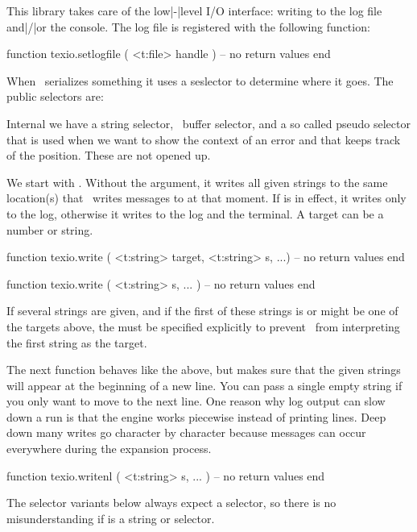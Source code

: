 \stopsection

\startsection[title={Input and output}]

This library takes care of the low|-|level I/O interface: writing to the log file
and|/|or the console. The log file is registered with the following function:

\starttyping[option=LUA]
function texio.setlogfile ( <t:file> handle )
    -- no return values
end
\stoptyping

When \TEX\ serializes something it uses a seslector to determine where it goes.
The public selectors are:


Internal we have a string selector, \LUA\ buffer selector, and a so called pseudo
selector that is used when we want to show the context of an error and that keeps
track of the position. These are not opened up.

We start with . Without the  argument, it writes
all given strings to the same location(s) that \TEX\ writes messages to at that
moment. If \type {\batchmode} is in effect, it writes only to the log, otherwise
it writes to the log and the terminal. A target can be a number or string.

\starttyping[option=LUA]
function texio.write ( <t:string> target, <t:string> s, ...)
    -- no return values
end

function texio.write ( <t:string> s, ... )
    -- no return values
end
\stoptyping

If several strings are given, and if the first of these strings is or might be
one of the targets above, the  must be specified explicitly to
prevent \LUA\ from interpreting the first string as the target.

The next function behaves like the above, but makes sure that the given strings
will appear at the beginning of a new line. You can pass a single empty string if
you only want to move to the next line. One reason why log output can slow down a
run is that the engine works piecewise instead of printing lines. Deep down many
writes go character by character because messages can occur everywhere during the
expansion process.

\starttyping[option=LUA]
function texio.writenl ( <t:string> s, ... )
    -- no return values
end
\stoptyping

The selector variants below always expect a selector, so there is no
misunderstanding if  is a string or selector.

